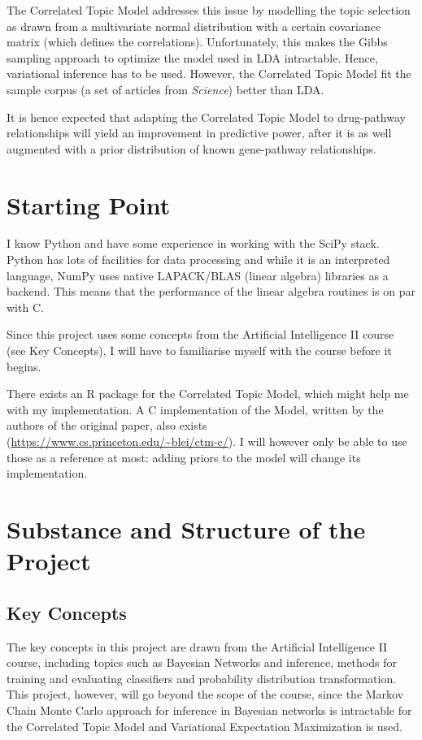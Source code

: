 \documentclass[12pt,a4]{article}
\begin{document}
The Correlated Topic Model\cite{2007} addresses this issue by modelling the topic selection as drawn from a multivariate normal distribution with a certain covariance matrix (which defines the correlations). Unfortunately, this makes the Gibbs sampling approach to optimize the model used in LDA intractable. Hence, variational inference has to be used. However, the Correlated Topic Model fit the sample corpus (a set of articles from {\em Science}) better than LDA.

It is hence expected that adapting the Correlated Topic Model to drug-pathway relationships will yield an improvement in predictive power, after it is as well augmented with a prior distribution of known gene-pathway relationships.

\section*{Starting Point}

I know Python and have some experience in working with the SciPy stack. Python has lots of facilities for data processing and while it is an interpreted language, NumPy uses native LAPACK/BLAS (linear algebra) libraries as a backend. This means that the performance of the linear algebra routines is on par with C.

Since this project uses some concepts from the Artificial Intelligence II course (see Key Concepts), I will have to familiarise myself with the course before it begins.

There exists an R package for the Correlated Topic Model, which might help me with my implementation. A C implementation of the Model, written by the authors of the original paper, also exists (\url{https://www.cs.princeton.edu/~blei/ctm-c/}). I will however only be able to use those as a reference at most: adding priors to the model will change its implementation.

\section*{Substance and Structure of the Project}

\subsection*{Key Concepts}

The key concepts in this project are drawn from the Artificial Intelligence II course, including topics such as Bayesian Networks and inference, methods for training and evaluating classifiers and probability distribution transformation. This project, however, will go beyond the scope of the course, since the Markov Chain Monte Carlo approach for inference in Bayesian networks is intractable for the Correlated Topic Model and Variational Expectation Maximization is used.
\end{document}
